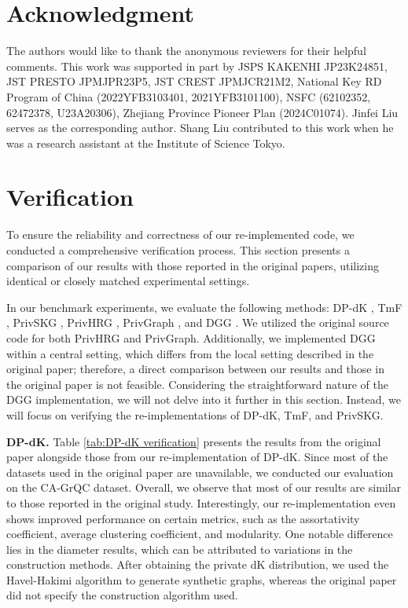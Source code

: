\documentclass[conference]{IEEEtran}
\theoremstyle{plain}
\begin{document}
\section*{Acknowledgment}
The authors would like to thank the anonymous reviewers for their helpful comments. 
This work was supported in part by JSPS KAKENHI JP23K24851, JST PRESTO JPMJPR23P5, JST CREST JPMJCR21M2, National Key RD Program of China (2022YFB3103401, 2021YFB3101100), NSFC (62102352, 62472378, U23A20306), Zhejiang Province Pioneer Plan (2024C01074).
Jinfei Liu serves as the corresponding author. 
Shang Liu contributed to this work when he was a research assistant at the Institute of Science Tokyo.







\newpage
\begin{appendices}
\end{appendices}

\section{Verification}
To ensure the reliability and correctness of our re-implemented code, we conducted a comprehensive verification process. 
This section presents a comparison of our results with those reported in the original papers, utilizing identical or closely matched experimental settings.

In our benchmark experiments, we evaluate the following methods: DP-dK \cite{wang2013preserving}, TmF \cite{nguyen2015differentially}, PrivSKG \cite{mir2012differentially}, PrivHRG \cite{xiao2014differentially}, PrivGraph \cite{yuan2023privgraph}, and DGG \cite{qin2017generating}. We utilized the original source code for both PrivHRG and PrivGraph. 
Additionally, we implemented DGG within a central setting, which differs from the local setting described in the original paper; therefore, a direct comparison between our results and those in the original paper is not feasible.
Considering the straightforward nature of the DGG implementation, we will not delve into it further in this section. 
Instead, we will focus on verifying the re-implementations of DP-dK, TmF, and PrivSKG.

\textbf{DP-dK.}
Table \ref{tab:DP-dK verification} presents the results from the original paper \cite{wang2013preserving} alongside those from our re-implementation of DP-dK. 
Since most of the datasets used in the original paper are unavailable, we conducted our evaluation on the CA-GrQC dataset. 
Overall, we observe that most of our results are similar to those reported in the original study. 
Interestingly, our re-implementation even shows improved performance on certain metrics, such as the assortativity coefficient, average clustering coefficient, and modularity.
One notable difference lies in the diameter results, which can be attributed to variations in the construction methods. 
After obtaining the private dK distribution, we used the Havel-Hakimi algorithm to generate synthetic graphs, whereas the original paper did not specify the construction algorithm used.
\end{document}
